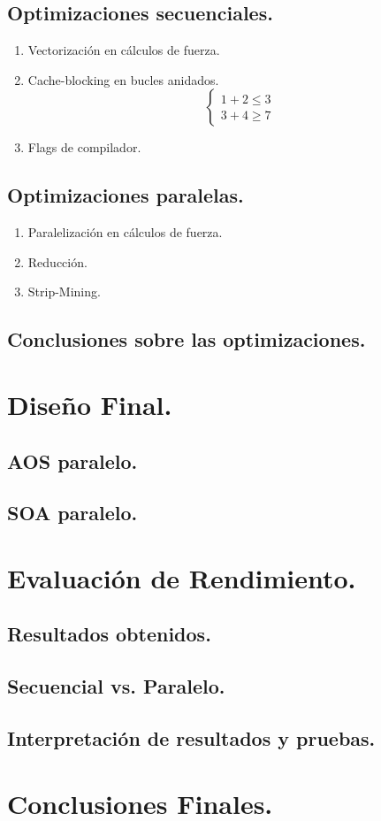 \documentclass{article}
\begin{document}
\subsection{Optimizaciones secuenciales.\label{opt_seq}}
\begin{enumerate}
\item Vectorización en cálculos de fuerza.

\item Cache-blocking en bucles anidados.
\begin{equation}
	\left\{
	\begin{array}{rrrr}
	1+2\leq3\\
	3+4\geq7
	\end{array}
	\right.
\end{equation}

\item Flags de compilador.
\end{enumerate}

\subsection{Optimizaciones paralelas.\label{opt_parallel}}

\begin{enumerate}
\item Paralelización en cálculos de fuerza.

\item Reducción.

\item Strip-Mining.
\end{enumerate}

\subsection{Conclusiones sobre las optimizaciones.}

\section{Diseño Final.\label{final}}
\subsection{AOS paralelo.}
\subsection{SOA paralelo.}

\section{Evaluación de Rendimiento.\label{performance}}
\subsection{Resultados obtenidos.}
\subsection{Secuencial vs. Paralelo.}
\subsection{Interpretación de resultados y pruebas.}

\section{Conclusiones Finales.\label{conclusiones}}
\end{document}
